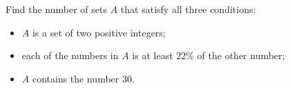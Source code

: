 Find the number of sets $A$ that satisfy all three conditions:
\begin{itemize}
\item $A$ is a set of two positive integers;
\item each of the numbers in $A$ is at least $22\%$ of the other number;
\item $A$ contains the number $30$.
\end{itemize}
